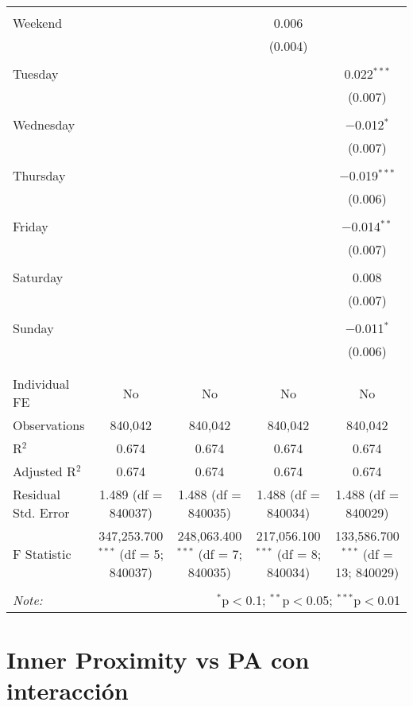 \documentclass[
]{article}
\begin{document}
\begin{table}[!htbp]
{\begin{tabular}{@{\extracolsep{5pt}}lcccc}
  & & & & \\ 
 Weekend &  &  & 0.006 &  \\ 
  &  &  & (0.004) &  \\ 
  & & & & \\ 
 Tuesday &  &  &  & 0.022$^{***}$ \\ 
  &  &  &  & (0.007) \\ 
  & & & & \\ 
 Wednesday &  &  &  & $-$0.012$^{*}$ \\ 
  &  &  &  & (0.007) \\ 
  & & & & \\ 
 Thursday &  &  &  & $-$0.019$^{***}$ \\ 
  &  &  &  & (0.006) \\ 
  & & & & \\ 
 Friday &  &  &  & $-$0.014$^{**}$ \\ 
  &  &  &  & (0.007) \\ 
  & & & & \\ 
 Saturday &  &  &  & 0.008 \\ 
  &  &  &  & (0.007) \\ 
  & & & & \\ 
 Sunday &  &  &  & $-$0.011$^{*}$ \\ 
  &  &  &  & (0.006) \\ 
  & & & & \\ 
\hline \\[-1.8ex] 
Individual FE & No & No & No & No \\ 
Observations & 840,042 & 840,042 & 840,042 & 840,042 \\ 
R$^{2}$ & 0.674 & 0.674 & 0.674 & 0.674 \\ 
Adjusted R$^{2}$ & 0.674 & 0.674 & 0.674 & 0.674 \\ 
Residual Std. Error & 1.489 (df = 840037) & 1.488 (df = 840035) & 1.488 (df = 840034) & 1.488 (df = 840029) \\ 
F Statistic & 347,253.700$^{***}$ (df = 5; 840037) & 248,063.400$^{***}$ (df = 7; 840035) & 217,056.100$^{***}$ (df = 8; 840034) & 133,586.700$^{***}$ (df = 13; 840029) \\ 
\hline 
\hline \\[-1.8ex] 
\textit{Note:}  & \multicolumn{4}{r}{$^{*}$p$<$0.1; $^{**}$p$<$0.05; $^{***}$p$<$0.01} \\ 
\end{tabular}
} 
\end{table} 
\newpage
\section{Inner Proximity vs PA con interacción}
\end{document}

